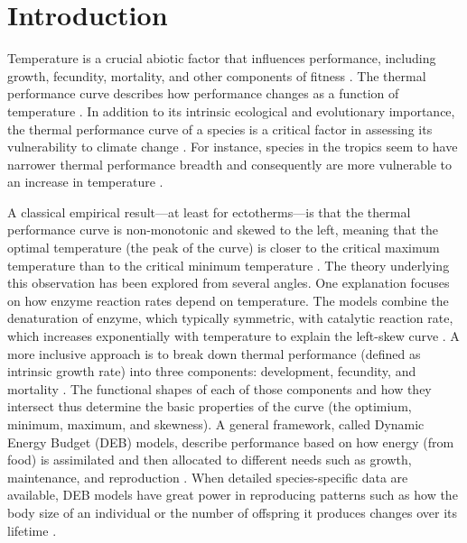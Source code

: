 \section*{Introduction}

Temperature is a crucial abiotic factor that influences performance, including growth, fecundity, mortality, and other components of fitness \citep{Birch1953,Angilletta2002,Huey1979,Savage2004}.
The thermal performance curve describes how performance changes as a function of temperature \citep{Huey1979,Angilletta2009, Amarasekare2012}.
In addition to its intrinsic ecological and evolutionary importance, the thermal performance curve of a species is a critical factor in assessing its vulnerability to climate change \citep{Calosi2008,Deutsch2008,Kingsolver2011}.
For instance, species in the tropics seem to have narrower thermal performance breadth and consequently are more vulnerable to an increase in temperature \citep{Deutsch2008}.

A classical empirical result---at least for ectotherms---is that the thermal performance curve is non-monotonic and skewed to the left, meaning that the optimal temperature (the peak of the curve) is closer to the critical maximum temperature than to the critical minimum temperature \citep{Barlow1962,Huey2001,Angilletta2009}.
The theory underlying this observation has been explored from several angles.
One explanation focuses on how enzyme reaction rates depend on temperature.
The models combine the denaturation of enzyme, which typically symmetric, with catalytic reaction rate, which increases exponentially with temperature to explain the left-skew curve \citep{VandH1996, VandH2002, Ratkowsky2005, Kingsolver2009}.
A more inclusive approach is to break down thermal performance (defined as intrinsic growth rate) into three components: development, fecundity, and mortality \citep{Amarasekare2012}.
The functional shapes of each of those components and how they intersect thus determine the basic properties of the curve (the optimium, minimum, maximum, and skewness).
A general framework, called Dynamic Energy Budget (DEB) models, describe performance based on how energy (from food) is assimilated and then allocated to different needs such as growth, maintenance, and reproduction \citep{Kooijman2009}. %
When detailed species-specific data are available, DEB models have great power in reproducing patterns such as how the body size of an individual or the number of offspring it produces changes over its lifetime \citep{Nisbet2000}. %

